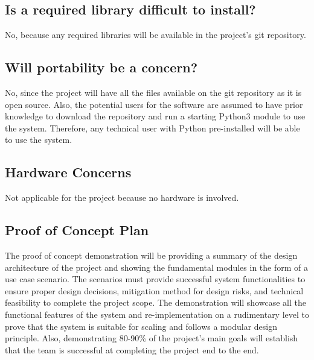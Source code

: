 \documentclass{article}
\begin{document}
\subsection{Is a required library difficult to install?}
No, because any required libraries will be available in the project's git repository.

\subsection{Will portability be a concern?}
No, since the project will have all the files available on the git repository as it is open source. Also, the potential users for the software are assumed to have prior knowledge to download the repository and run a starting Python3 module to use the system. Therefore, any technical user with Python pre-installed will be able to use the system.

\subsection{Hardware Concerns}
Not applicable for the project because no hardware is involved. 

\subsection{Proof of Concept Plan}
The proof of concept demonstration will be providing a summary of the design architecture of the project and showing the fundamental modules in the form of a use case scenario. The scenarios must provide successful system functionalities to ensure proper design decisions, mitigation method for design risks, and technical feasibility to complete the project scope. The demonstration will showcase all the functional features of the system and re-implementation on a rudimentary level to prove that the system is suitable for scaling and follows a modular design principle. Also, demonstrating 80-90\% of the project's main goals will establish that the team is successful at completing the project end to the end.


\end{document}
